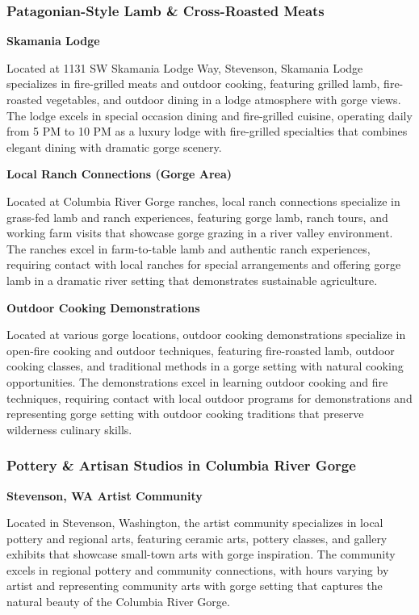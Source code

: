 \documentclass[
  11pt,
  letterpaper,
  DIV=10,
  numbers=noendperiod]{scrartcl}
\begin{document}
\subsubsection{Patagonian-Style Lamb \& Cross-Roasted
Meats}\label{patagonian-style-lamb-cross-roasted-meats-4}

\textbf{Skamania Lodge}

Located at 1131 SW Skamania Lodge Way, Stevenson, Skamania Lodge
specializes in fire-grilled meats and outdoor cooking, featuring grilled
lamb, fire-roasted vegetables, and outdoor dining in a lodge atmosphere
with gorge views. The lodge excels in special occasion dining and
fire-grilled cuisine, operating daily from 5 PM to 10 PM as a luxury
lodge with fire-grilled specialties that combines elegant dining with
dramatic gorge scenery.

\textbf{Local Ranch Connections (Gorge Area)}

Located at Columbia River Gorge ranches, local ranch connections
specialize in grass-fed lamb and ranch experiences, featuring gorge
lamb, ranch tours, and working farm visits that showcase gorge grazing
in a river valley environment. The ranches excel in farm-to-table lamb
and authentic ranch experiences, requiring contact with local ranches
for special arrangements and offering gorge lamb in a dramatic river
setting that demonstrates sustainable agriculture.

\textbf{Outdoor Cooking Demonstrations}

Located at various gorge locations, outdoor cooking demonstrations
specialize in open-fire cooking and outdoor techniques, featuring
fire-roasted lamb, outdoor cooking classes, and traditional methods in a
gorge setting with natural cooking opportunities. The demonstrations
excel in learning outdoor cooking and fire techniques, requiring contact
with local outdoor programs for demonstrations and representing gorge
setting with outdoor cooking traditions that preserve wilderness
culinary skills.

\subsubsection{Pottery \& Artisan Studios in Columbia River
Gorge}\label{pottery-artisan-studios-in-columbia-river-gorge}

\textbf{Stevenson, WA Artist Community}

Located in Stevenson, Washington, the artist community specializes in
local pottery and regional arts, featuring ceramic arts, pottery
classes, and gallery exhibits that showcase small-town arts with gorge
inspiration. The community excels in regional pottery and community
connections, with hours varying by artist and representing community
arts with gorge setting that captures the natural beauty of the Columbia
River Gorge.
\end{document}
